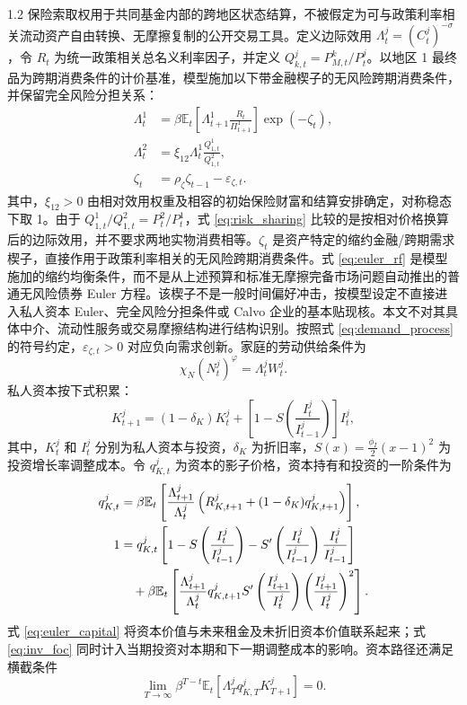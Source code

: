 \documentclass[12pt,UTF8]{ctexart}
\newcommand{\E}{\mathbb{E}}
\begin{document}
\begin{spacing}{1.2}
		保险索取权用于共同基金内部的跨地区状态结算，不被假定为可与政策利率相关流动资产自由转换、无摩擦复制的公开交易工具。定义边际效用 $\Lambda_{t}^j=(C_{t}^j)^{-\sigma}$，令 $R_t$ 为统一政策相关总名义利率因子，并定义 $Q_{k,t}^j=P_{M,t}^k/P_t^j$。以地区 1 最终品为跨期消费条件的计价基准，模型施加以下带金融楔子的无风险跨期消费条件，并保留完全风险分担关系：
		\begin{align}
			\Lambda_{t}^1 &=\beta \E_t\left[\Lambda_{t+1}^1\frac{R_t}{\Pi_{t+1}^1}\right]\exp(-\zeta_t), \label{eq:euler_rf} \\
			\Lambda_{t}^2 &=\xi_{12}\Lambda_{t}^1\frac{Q_{1,t}^1}{Q_{1,t}^2},
			\label{eq:risk_sharing}\\
			\zeta_t&=\rho_\zeta\zeta_{t-1}-\varepsilon_{\zeta,t}.
			\label{eq:demand_process}
		\end{align}
		其中，$\xi_{12}>0$ 由相对效用权重及相容的初始保险财富和结算安排确定，对称稳态下取 1。由于 $Q_{1,t}^1/Q_{1,t}^2=P_t^2/P_t^1$，式 \eqref{eq:risk_sharing} 比较的是按相对价格换算后的边际效用，并不要求两地实物消费相等。$\zeta_t$ 是资产特定的缩约金融/跨期需求楔子，直接作用于政策利率相关的无风险跨期消费条件。式 \eqref{eq:euler_rf} 是模型施加的缩约均衡条件，而不是从上述预算和标准无摩擦完备市场问题自动推出的普通无风险债券 Euler 方程。该楔子不是一般时间偏好冲击，按模型设定不直接进入私人资本 Euler、完全风险分担条件或 Calvo 企业的基本贴现核。本文不对其具体中介、流动性服务或交易摩擦结构进行结构识别。按照式 \eqref{eq:demand_process} 的符号约定，$\varepsilon_{\zeta,t}>0$ 对应负向需求创新。家庭的劳动供给条件为
		\begin{equation}
			\chi_N(N_{t}^j)^{\varphi}=\Lambda_{t}^j W_t^j.
			\label{eq:labor_R}
		\end{equation}
		私人资本按下式积累：
		\begin{equation}
			K_{t+1}^j=(1-\delta_K)K_t^j+
			\left[1-S\left(\frac{I_t^j}{I_{t-1}^j}\right)\right]I_t^j,
			\label{eq:K_law}
		\end{equation}
		其中，$K_t^j$ 和 $I_t^j$ 分别为私人资本与投资，$\delta_K$ 为折旧率，$S(x)=\frac{\phi_I}{2}(x-1)^2$ 为投资增长率调整成本。令 $q_{K,t}^j$ 为资本的影子价格，资本持有和投资的一阶条件为
		\begin{align}
			q_{K,t}^j &=\beta\E_t\left[
			\frac{\Lambda_{t+1}^j}{\Lambda_{t}^j}
			\left(R_{K,t+1}^j+(1-\delta_K)q_{K,t+1}^j\right)
			\right], \label{eq:euler_capital}\\
			1 &=q_{K,t}^j
			\left[
			1-S\left(\frac{I_t^j}{I_{t-1}^j}\right)
			-S'\left(\frac{I_t^j}{I_{t-1}^j}\right)\frac{I_t^j}{I_{t-1}^j}
			\right] \notag \\
			&\quad +\beta\E_t\left[
			\frac{\Lambda_{t+1}^j}{\Lambda_{t}^j}
			q_{K,t+1}^j
			S'\left(\frac{I_{t+1}^j}{I_t^j}\right)
			\left(\frac{I_{t+1}^j}{I_t^j}\right)^2
			\right].
			\label{eq:inv_foc}
		\end{align}
		式 \eqref{eq:euler_capital} 将资本价值与未来租金及未折旧资本价值联系起来；式 \eqref{eq:inv_foc} 同时计入当期投资对本期和下一期调整成本的影响。资本路径还满足横截条件
		\begin{equation}
			\lim_{T\to\infty}\beta^{T-t}\E_t\left[
			\Lambda_{T}^j q_{K,T}^jK_{T+1}^j
			\right]=0.
			\label{eq:private_capital_tvc}
		\end{equation}
		

\end{spacing}
\end{document}
